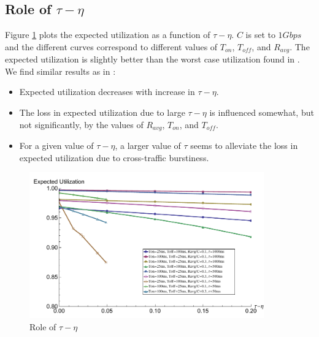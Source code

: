   \subsection{Role of $\tau - \eta$}
    Figure \ref{rtttaueta} plots the expected utilization as a function of 
    $\tau - \eta$. $C$ is set to $1Gbps$ and the different curves correspond 
    to different values of $T_{on}$, $T_{off}$, and $R_{avg}$. The expected 
    utilization is slightly better than the worst case utilization found in 
    \cite{Lovewell2011-Noise-TR}. We find similar results as in 
    \cite{Lovewell2011-Noise-TR}:
    \begin{itemize}
      \item Expected utilization  decreases with increase in $\tau - \eta$.
      \item The loss in expected utilization due to large $\tau - \eta$ is 
      influenced somewhat, but not significantly, by the values of $R_{avg}$, 
      $T_{on}$, and $T_{off}$.
      \item For a given value of $\tau - \eta$, a larger value of $\tau$ seems 
      to alleviate the loss in expected utilization due to cross-traffic 
      burstiness.
    \end{itemize}
    \begin{figure}[!htb]
      \centering
      \includegraphics[width=0.9\textwidth]{img/rtttaueta.pdf}
      \caption{Role of $\tau - \eta$}
      \label{rtttaueta}
    \end{figure}

